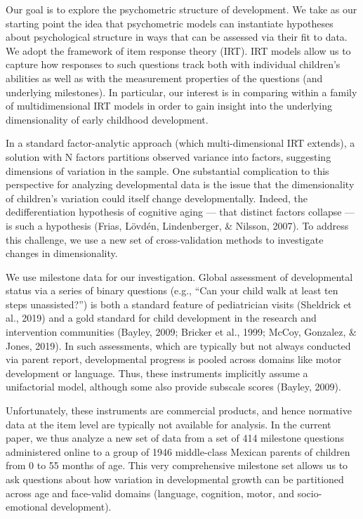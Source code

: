 \documentclass[10pt, letterpaper]{article}
\begin{document}
Our goal is to explore the psychometric structure of development. We
take as our starting point the idea that psychometric models can
instantiate hypotheses about psychological structure in ways that can be
assessed via their fit to data. We adopt the framework of item response
theory (IRT). IRT models allow us to capture how responses to such
questions track both with individual children's abilities as well as
with the measurement properties of the questions (and underlying
milestones). In particular, our interest is in comparing within a family
of multidimensional IRT models in order to gain insight into the
underlying dimensionality of early childhood development.

In a standard factor-analytic approach (which multi-dimensional IRT
extends), a solution with N factors partitions observed variance into
factors, suggesting dimensions of variation in the sample. One
substantial complication to this perspective for analyzing developmental
data is the issue that the dimensionality of children's variation could
itself change developmentally. Indeed, the dedifferentiation hypothesis
of cognitive aging --- that distinct factors collapse --- is such a
hypothesis (Frias, Lövdén, Lindenberger, \& Nilsson, 2007). To address
this challenge, we use a new set of cross-validation methods to
investigate changes in dimensionality.

We use milestone data for our investigation. Global assessment of
developmental status via a series of binary questions (e.g., ``Can your
child walk at least ten steps unassisted?'') is both a standard feature
of pediatrician visits (Sheldrick et al., 2019) and a gold standard for
child development in the research and intervention communities (Bayley,
2009; Bricker et al., 1999; McCoy, Gonzalez, \& Jones, 2019). In such
assessments, which are typically but not always conducted via parent
report, developmental progress is pooled across domains like motor
development or language. Thus, these instruments implicitly assume a
unifactorial model, although some also provide subscale scores (Bayley,
2009).

Unfortunately, these instruments are commercial products, and hence
normative data at the item level are typically not available for
analysis. In the current paper, we thus analyze a new set of data from a
set of 414 milestone questions administered online to a group of 1946
middle-class Mexican parents of children from 0 to 55 months of age.
This very comprehensive milestone set allows us to ask questions about
how variation in developmental growth can be partitioned across age and
face-valid domains (language, cognition, motor, and socio-emotional
development).
\end{document}
